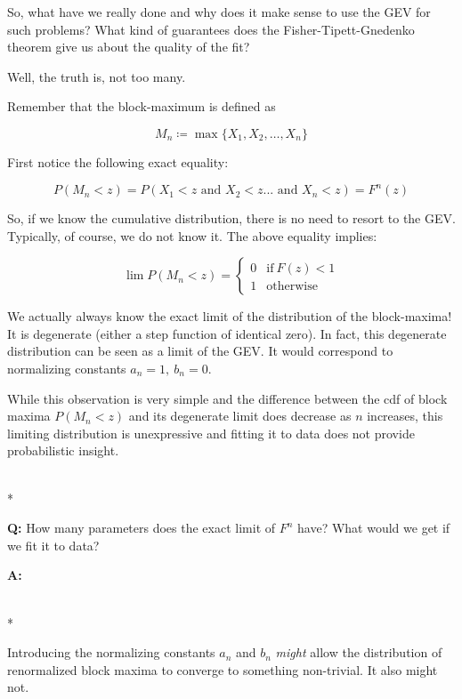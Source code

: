 So, what have we really done and why does it make sense to use the GEV for such
problems? What kind of guarantees does the Fisher-Tipett-Gnedenko theorem give
us about the quality of the fit?


Well, the truth is, not too many.  

Remember that the block-maximum is defined as

\begin{equation}
  M_n \coloneqq \max\{ X_1, X_2, \dots, X_n \}
\end{equation}

First notice the following exact equality:


\begin{equation}
    P(M_n < z) = P(X_1< z \text{ and } X_2 < z ... \text{ and  } X_n < z) = F^n(z)
\end{equation}


So, if we know the cumulative distribution, there is no need to resort to the
GEV. Typically, of course, we do not know it. The above equality implies:


\begin{equation}
    \lim P(M_n < z) =     
        \begin{cases}
          0 & \text{if}\ F(z) < 1 \\
          1 & \text{otherwise}
        \end{cases}
\end{equation}


We actually always know the exact limit of the distribution of the block-maxima!
It is degenerate (either a step function of identical zero). In fact, this
degenerate distribution can be seen as a limit of the GEV. It would correspond
to normalizing constants $a_n=1, \ b_n=0$.

While this observation is very simple and the difference between the cdf of
block maxima $P(M_n < z)$ and its degenerate limit does decrease as $n$
increases, this limiting distribution is unexpressive and fitting it to data
does not provide probabilistic insight.

\hrulefill\\*

\textbf{Q:} How many parameters does the exact limit of $F^n$ have? What would we get if we fit it to data?

\textbf{A:}

\hrulefill\\*

Introducing the normalizing constants $a_n$ and $b_n$ \textit{might} allow the
distribution of renormalized block maxima to converge to something non-trivial.
It also might not.


